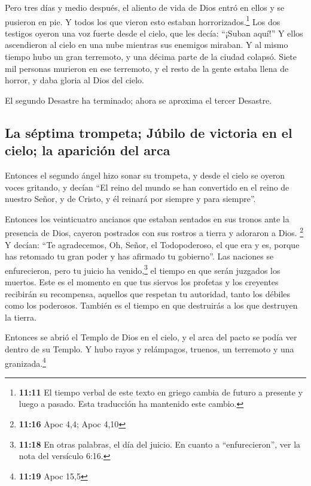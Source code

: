  Pero tres días y medio después, el aliento de vida de
Dios entró en ellos y se pusieron en pie. Y todos los que vieron esto
estaban horrorizados.\footnote{\textbf{11:11} El tiempo verbal de este
  texto en griego cambia de futuro a presente y luego a pasado. Esta
  traducción ha mantenido este cambio.}  Los dos testigos
oyeron una voz fuerte desde el cielo, que les decía: ``¡Suban aquí!'' Y
ellos ascendieron al cielo en una nube mientras sus enemigos miraban.
 Y al mismo tiempo hubo un gran terremoto, y una décima
parte de la ciudad colapsó. Siete mil personas murieron en ese
terremoto, y el resto de la gente estaba llena de horror, y daba gloria
al Dios del cielo.

 El segundo Desastre ha terminado; ahora se aproxima el
tercer Desastre.

\hypertarget{la-suxe9ptima-trompeta-juxfabilo-de-victoria-en-el-cielo-la-apariciuxf3n-del-arca}{%
\subsection{La séptima trompeta; Júbilo de victoria en el cielo; la
aparición del
arca}\label{la-suxe9ptima-trompeta-juxfabilo-de-victoria-en-el-cielo-la-apariciuxf3n-del-arca}}

 Entonces el segundo ángel hizo sonar su trompeta, y
desde el cielo se oyeron voces gritando, y decían ``El reino del mundo
se han convertido en el reino de nuestro Señor, y de Cristo, y él
reinará por siempre y para siempre''.

 Entonces los veinticuatro ancianos que estaban sentados
en sus tronos ante la presencia de Dios, cayeron postrados con sus
rostros a tierra y adoraron a Dios. \footnote{\textbf{11:16} Apoc 4,4;
  Apoc 4,10}  Y decían: ``Te agradecemos, Oh, Señor, el
Todopoderoso, el que era y es, porque has retomado tu gran poder y has
afirmado tu gobierno''.  Las naciones se enfurecieron,
pero tu juicio ha venido,\footnote{\textbf{11:18} En otras palabras, el
  día del juicio. En cuanto a ``enfurecieron'', ver la nota del
  versículo 6:16.} el tiempo en que serán juzgados los muertos. Este es
el momento en que tus siervos los profetas y los creyentes recibirán su
recompensa, aquellos que respetan tu autoridad, tanto los débiles como
los poderosos. También es el tiempo en que destruirás a los que
destruyen la tierra.

 Entonces se abrió el Templo de Dios en el cielo, y el
arca del pacto se podía ver dentro de su Templo. Y hubo rayos y
relámpagos, truenos, un terremoto y una granizada.\footnote{\textbf{11:19}
  Apoc 15,5}

